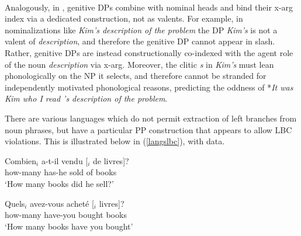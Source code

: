 \documentclass[output=paper
 	        ,biblatex
                ,babelshorthands
                ,newtxmath
                ,draftmode
                ,colorlinks, citecolor=brown
]{langscibook}
\begin{document}
\ea \label{the68}
\zlast

\noindent\\
Analogously, in  \citet[133]{cxsag07},  genitive DPs combine with nominal heads and bind their {\sc x-arg} index via a dedicated  construction, not as valents.
For example,  in nominalizations like \emph{Kim's description of the problem} the  DP \emph{Kim's} is not a valent of \emph{description}, and  therefore the genitive DP cannot appear in {\sc slash}.
 Rather, genitive DPs are instead constructionally co-indexed with the agent role of the noun \emph{description}  via {\sc x-arg}.  
 Moreover, the clitic \emph{s} in \emph{Kim's} must lean phonologically on the NP it selects, and therefore cannot be stranded for independently motivated phonological reasons, predicting  the oddness of *\emph{It was Kim who I read 's description of the problem}.

There are various  languages  which do not permit extraction of left branches from noun phrases, 
but have a particular PP construction that appears to allow LBC violations.
This is illustrated below in (\ref{langslbc}), with  data. 

\eal \label{langslbc}
\ex \gll Combien$_i$  a-t-il  vendu  [\spc$_i$  de  livres]?\\
how-many  has-he  sold {} of  books\\
\glt `How many books did he sell?'

\ex[*] \gll Quels$_i$  avez-vous  achet\'{e}  [\spc$_i$  livres]?\\
how-many  have-you  bought {}  books\\
\glt `How many books have you bought' 
\end{document}
